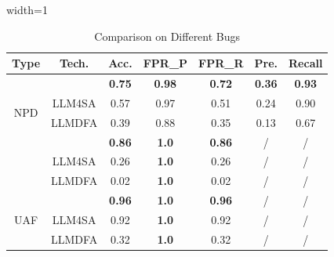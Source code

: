 \begin{table}[htb]
    \centering
    \caption{Comparison on Different Bugs}\label{table:rq1}
    \footnotesize
    \begin{adjustbox}{width=1\linewidth}
        \begin{tabular}{c|c|c|c|c|c|c}
        \hline
        \textbf{Type} & \textbf{Tech.} & \textbf{Acc.} &
        \textbf{FPR\_P} & \textbf{FPR\_R} &
        \textbf{Pre.} & \textbf{Recall} \\ \hline

        \multirow{4}{*}{NPD}& \app{} & \textbf{0.75}  & \textbf{0.98} & \textbf{0.72} &\textbf{ 0.36} &  \textbf{0.93}\\
        & LLM4SA &  0.57 & 0.97 &  0.51& 0.24 & 0.90\\
        & LLMDFA & 0.39  & 0.88  & 0.35  & 0.13 & 0.67 \\\hline 
        
        \multirow{4}{*}{BOF}& \app{} & \textbf{0.86} & \textbf{1.0} & \textbf{0.86} & / & /  \\
        & LLM4SA & 0.26 & \textbf{1.0} & 0.26 & / & / \\
        & LLMDFA & 0.02  & \textbf{1.0} & 0.02 & / & /\\\hline 

        \multirow{4}{*}{UAF}& \app{} & \textbf{0.96}  & \textbf{1.0} & \textbf{0.96} & / & / \\
        & LLM4SA & 0.92  & \textbf{1.0} & 0.92 & / & / \\
        & LLMDFA & 0.32  & \textbf{1.0} & 0.32 & / & / \\\hline 

        \end{tabular}
    \end{adjustbox}
\end{table}


